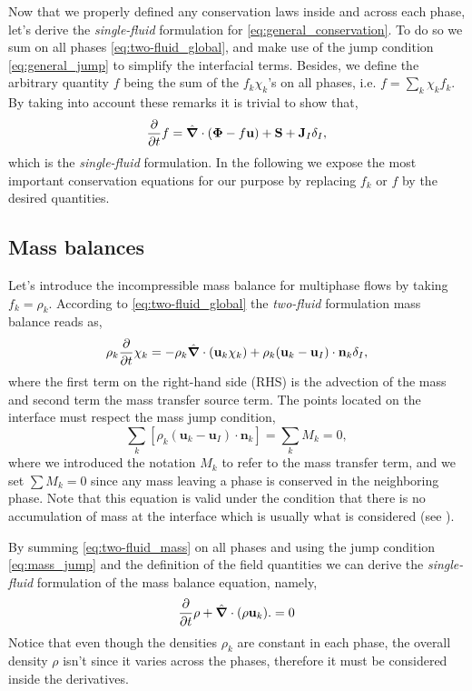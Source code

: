 Now that we properly defined any conservation laws inside and across each phase, let's derive the \textit{single-fluid} formulation for \ref{eq:general_conservation}.
To do so we sum on all phases \ref{eq:two-fluid_global}, and make use of the jump condition \ref{eq:general_jump} to simplify the interfacial terms. 
Besides, we define the arbitrary quantity $f$ being the sum of the $f_k\chi_k$'s on all phases, i.e. $f = \sum_k \chi_k f_k$.
By taking into account these remarks it is trivial to show that, 
\begin{equation}
    \frac{\partial}{\partial t} f
    = \hat{\bm{\nabla}} \cdot (\bm{\Phi} - f \textbf{u})
    + \textbf{S}
    + \textbf{J}_I \delta_I,
    \label{eq:single-fluid_global}
\end{equation}
which is the \textit{single-fluid} formulation. 
In the following we expose the most important conservation equations for our purpose by replacing $f_k$ or $f$ by the desired quantities.  

\subsection{Mass balances}

Let's introduce the incompressible mass balance for multiphase flows by taking $f_k = \rho_k$. 
According to \ref{eq:two-fluid_global} the \textit{two-fluid} formulation mass balance reads as,
\begin{equation}
    \rho_k\frac{\partial}{\partial t}\chi_k
    = 
    - \rho_k\hat{\bm{\nabla}}\cdot(\textbf{u}_k \chi_k)  
    + \rho_k (\textbf{u}_k-\textbf{u}_I) \cdot \textbf{n}_k \delta_I,
    \label{eq:two-fluid_mass}
\end{equation}
where the first term on the right-hand side (RHS) is the advection of the mass and second term the mass transfer source term.
The points located on the interface must respect the mass jump condition,
\begin{equation}
    \sum_k \left[
        \rho_k (\textbf{u}_k-\textbf{u}_I) \cdot \textbf{n}_k
    \right]
    =\sum_k M_k 
    = 0,
    \label{eq:mass_jump}
\end{equation}
where we introduced the notation $M_k$ to refer to the mass transfer term, and we set $\sum M_k =0$ since any mass leaving a phase is conserved in the neighboring phase.
Note that this equation is valid under the condition that there is no accumulation of mass at the 
interface which is usually what is considered (see \citet{morel2015mathematical}). 

By summing \ref{eq:two-fluid_mass} on all phases and using the jump condition \ref{eq:mass_jump} and the definition of the field quantities we can derive the \textit{single-fluid} formulation of the mass balance equation, namely,  
\begin{equation}
    \frac{\partial}{\partial t} \rho
    + \hat{\bm{\nabla}}\cdot(\rho\textbf{u}_k). 
    = 0 
    \label{eq:single-fluid_mass}
\end{equation}
Notice that even though the densities $\rho_k$ are constant in each phase, the overall density $\rho$ isn't since it varies across the phases, therefore it must be considered inside the derivatives.


